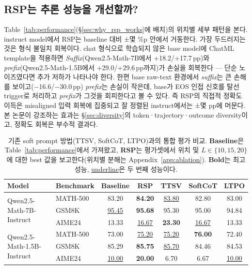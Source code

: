 \subsection{RSP는 추론 성능을 개선할까?}\label{sec:performance}

Table~\ref{tab:performance}(\S\ref{sec:why_rsp_works}에 배치)의 위치별 세부 패턴을 본다. instruct model에서 RSP는 baseline 대비 ±몇 \%p 안에서 거동한다. 가장 두드러지는 것은 형식 불일치 회복이다. chat 형식으로 학습되지 않은 base model에 ChatML template을 적용하면 \emph{Suffix}(Qwen2.5-Math-7B에서 +18.2/+17.7\,pp)와 \emph{prefix}(Qwen2.5-Math-1.5B에서 +29.0/+29.6\,pp까지)가 손실을 회복한다 --- 단순 노이즈였다면 추가 저하가 나타나야 한다. 한편 base raw-text 환경에서 \emph{suffix}는 큰 손해를 보이고($-$16.6/$-$30.0\,pp) \emph{prefix}는 손실이 작은데, base가 EOS 인접 신호를 탈선 trigger로 처리하고 \emph{prefix}가 그것을 회피한다고 볼 수 있다. 즉 RSP의 직접적 정확도 이득은 misaligned 입력 회복에 집중되고 잘 정렬된 instruct에서는 ±몇 pp에 머문다. 본 논문이 강조하는 효과는 \S\ref{sec:diversity}의 token·trajectory·outcome diversity이고, 정확도 회복은 부수적 결과다.

\begin{table}[!t]
\centering
\caption{기존 soft prompt 방법(TTSV, SoftCoT, LTPO)과의 통합 평가 비교. \textbf{Baseline}은 Table~\ref{tab:performance}에서 가져왔고, \textbf{RSP}는 평가셋에서 위치 및 $L\in\{10,15,20\}$에 대한 best 값을 보고한다(위치별 분해는 Appendix~\ref{app:ablation}). \textbf{Bold}는 최고 성능, \underline{underline}은 두 번째 성능이다.}
\label{tab:prior_comparison}
\footnotesize
\renewcommand{\arraystretch}{0.9}
\begin{tabular}{llccccc}
\toprule
\textbf{Model} & \textbf{Benchmark} & \textbf{Baseline} & \cellcolor{blue!10}\textbf{RSP} & \textbf{TTSV} & \textbf{SoftCoT} & \textbf{LTPO} \\
\midrule
\multirow{3}{*}{Qwen2.5-Math-7B-Instruct} & MATH-500 & 83.20 & \cellcolor{blue!10}\textbf{84.20} & \underline{83.80} & 82.80 & 83.00 \\
 & GSM8K   & \underline{95.45} & \cellcolor{blue!10}\textbf{95.68} & 95.30 & 95.00 & 94.84 \\
 & AIME24  & 13.33 & \cellcolor{blue!10}\underline{16.67} & \textbf{23.30} & \underline{16.67} & 13.33 \\
\midrule
\multirow{3}{*}{Qwen2.5-Math-1.5B-Instruct} & MATH-500 & 73.00 & \cellcolor{blue!10}\underline{75.20} & \underline{75.20} & \textbf{76.00} & 72.40 \\
 & GSM8K   & 85.29 & \cellcolor{blue!10}\textbf{85.75} & \underline{85.70} & 84.46 & 84.53 \\
 & AIME24  & \underline{10.00} & \cellcolor{blue!10}\textbf{20.00} &  6.70 &  6.67 & \underline{10.00} \\
\bottomrule
\end{tabular}
\end{table}

